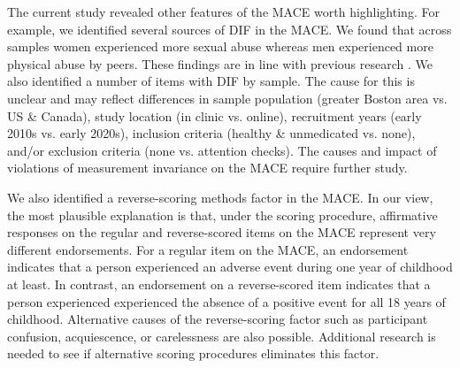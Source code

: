 \documentclass[letterpaper,man,natbib,floatsintext,longtable]{apa6}
\begin{document}

The current study revealed other features of the MACE worth highlighting. For example, we identified several sources of DIF in the MACE. We found that across samples women experienced more sexual abuse whereas men experienced more physical abuse by peers. These findings are in line with previous research \citep{radford2013prevalence}. We also identified a number of items with DIF by sample. The cause for this is unclear and may reflect differences in sample population (greater Boston area vs. US \& Canada), study location (in clinic vs. online), recruitment years (early 2010s vs. early 2020s), inclusion criteria (healthy \& unmedicated vs. none), and/or exclusion criteria (none vs. attention checks). The causes and impact of violations of measurement invariance on the MACE require further study. 

We also identified a reverse-scoring methods factor in the MACE. In our view, the most plausible explanation is that, under the \cite{teicher2015maltreatment} scoring procedure, affirmative responses on the regular and reverse-scored items on the MACE represent very different endorsements. For a regular item on the MACE, an endorsement indicates that a person experienced an adverse event during one year of childhood at least. In contrast, an endorsement on a reverse-scored item indicates that a person experienced experienced the absence of a positive event for all 18 years of childhood. Alternative causes of the reverse-scoring factor such as participant confusion, acquiescence, or carelessness \citep{weijters2013reversed} are also possible. Additional research is needed to see if alternative scoring procedures eliminates this factor. 
\end{document}
